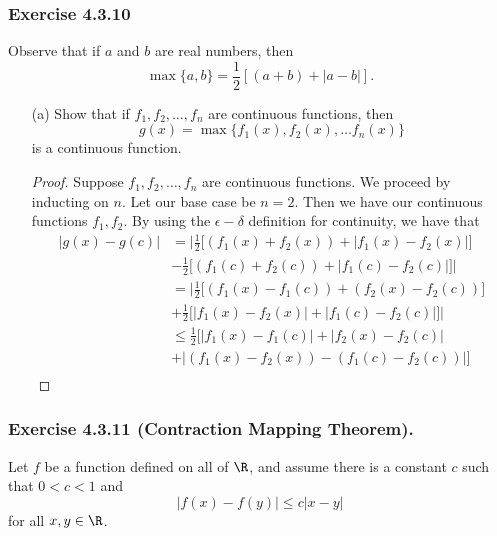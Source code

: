 \subsubsection{Exercise 4.3.10} Observe that if \( a  \) and \( b  \) are real numbers, then 
\[  \max \{ a,b  \} = \frac{ 1 }{ 2 } [ (a+b) + | a - b  | ]. \]

\begin{enumerate}
    \item[(a)] Show that if \( f_1, f_2, \dots, f_n  \) are continuous functions, then 
        \[ g(x) = \max \{ f_1(x), f_2(x), \dots f_n(x) \}  \]
        is a continuous function.
        \begin{proof}
        Suppose \( f_1, f_2, \dots, f_n  \) are continuous functions. We proceed by inducting on \( n  \). Let our base case be \( n = 2  \). Then we have our continuous functions \( f_1, f_2  \). By using the \( \epsilon -\delta \) definition for continuity, we have that 
        \begin{align*}
            | g(x) - g(c) | &= \Big| \frac{ 1 }{ 2 } \Big[ (f_1(x) + f_2(x)) + | f_1(x) - f_2(x) |  \Big] \\
                            &- \frac{ 1 }{ 2 } \Big[ (f_1(c) + f_2(c)) + | f_1(c) - f_2(c) |  \Big] \Big|  \\
                            &= \Big| \frac{ 1 }{ 2 } \Big[  (f_1(x) - f_1(c)) + (f_2(x) - f_2(c))    \Big] \\  &+ \frac{ 1 }{ 2 } \Big[ |f_1(x) - f_2(x)| + | f_1(c) - f_2(c) |  \Big] \Big| \\
                            &\leq \frac{ 1 }{ 2 } \Big[ | f_1(x) - f_1(c)  | + | f_2(x) - f_2(c) |  \\ 
                            &+ | (f_1(x) - f_2(x)) - (f_1(c) -f_2(c))| \Big] \\
        \end{align*}
        \end{proof}
\end{enumerate}









\subsubsection{Exercise 4.3.11 (Contraction Mapping Theorem).} Let \( f  \) be a function defined on all of \( \R  \), and assume there is a constant \( c  \) such that \(  0 < c < 1 \) and 
\[  | f(x) - f(y) | \leq c | x - y |  \]
for all \( x,y \in \R  \).

